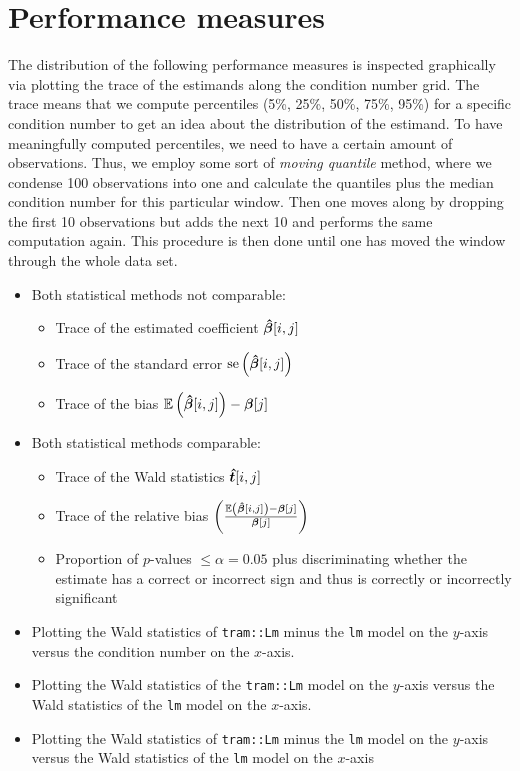 \documentclass[11pt,a4paper,twoside]{book}\usepackage[]{graphicx}\usepackage[]{xcolor}
\begin{document}
\section{Performance measures}\label{sec:performance}
The distribution of the following performance measures is inspected graphically via plotting the trace of the estimands along the condition number grid. The trace means that we compute percentiles (5\%, 25\%, 50\%, 75\%, 95\%) for a specific condition number to get an idea about the distribution of the estimand.
To have meaningfully computed percentiles, we need to have a certain amount of observations.
Thus, we employ some sort of \textit{moving quantile} method, where we condense 100 observations into one and calculate the quantiles plus the median condition number for this particular window.
Then one moves along by dropping the first 10 observations but adds the next 10 and performs the same computation again.
This procedure is then done until one has moved the window through the whole data set.
\begin{itemize}
\item Both statistical methods not comparable:
  \begin{itemize}
  \item Trace of the estimated coefficient ${\boldsymbol{\hat\beta}}[i,j]$
  \item Trace of the standard error $\operatorname{se}\left({\boldsymbol{\hat\beta}}[i,j]\right)$
  \item Trace of the bias $\operatorname{\mathbb{E}}\left({\boldsymbol{\hat\beta}}[i,j]\right)-{\boldsymbol{\beta}}[j]$
  \end{itemize}
\item Both statistical methods comparable:
  \begin{itemize}
  \item Trace of the Wald statistics ${\boldsymbol{\hat{t}}}[i,j]$ 
  \item Trace of the relative bias $\left(\frac{\operatorname{\mathbb{E}}\left({\boldsymbol{\hat\beta}}[i,j]\right)-{\boldsymbol{\beta}}[j]}{{\boldsymbol{\beta}}[j]}\right)$
  \item Proportion of $p$-values $\leq\alpha=0.05$ plus discriminating whether the estimate has a correct or incorrect sign and thus is correctly or incorrectly significant
  \end{itemize}
\item Plotting the Wald statistics of \texttt{tram::Lm} minus the \texttt{lm} model on the $y$-axis versus the condition number on the $x$-axis.
\item Plotting the Wald statistics of the \texttt{tram::Lm} model on the $y$-axis versus the Wald statistics of the \texttt{lm} model on the $x$-axis.
\item Plotting the Wald statistics of \texttt{tram::Lm} minus the \texttt{lm} model on the $y$-axis versus the Wald statistics of the \texttt{lm} model on the $x$-axis
\end{itemize}
\end{document}
